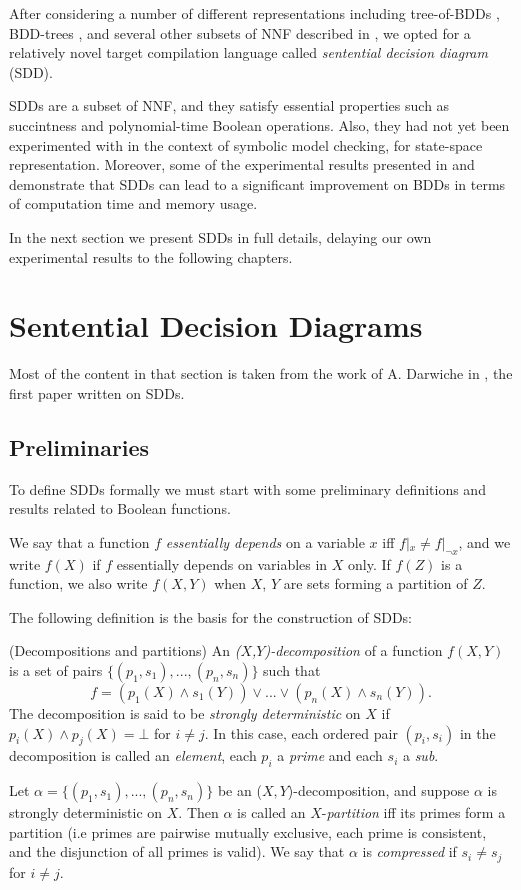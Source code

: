 \documentclass[11pt]{report}
\newenvironment{definition}[1][Definition]{\begin{trivlist}
\item[\hskip \labelsep {\bfseries #1}]}{\end{trivlist}}
\begin{document}
After considering a number of different representations including tree-of-BDDs \cite{trees_of_bdds}, BDD-trees \cite{bdd_trees}, and several other subsets of NNF described in \cite{compilation_map}, we opted for a relatively novel target compilation language called \textit{sentential decision diagram} (SDD). 

SDDs are a subset of NNF, and they satisfy essential properties such as succintness and polynomial-time Boolean operations. Also, they had not yet been experimented with in the context of symbolic model checking, for state-space representation. 
Moreover, some of the experimental results presented in \cite{sdd_1} and \cite{sdd_3} demonstrate that SDDs can lead to a significant improvement on BDDs in terms of computation time and memory usage. 

In the next section we present SDDs in full details, delaying our own experimental results to the following chapters.


\section{Sentential Decision Diagrams}

Most of the content in that section is taken from the work of A. Darwiche in \cite{sdd_1}, the first paper written on SDDs. 

\subsection{Preliminaries}

To define SDDs formally we must start with some preliminary definitions and results related to Boolean functions. 

\begin{definition} 
We say that a function $f$ \textit{essentially depends} on a variable $x$ iff $f|_{x} \neq f|_{\lnot x}$, and we write $f(X)$ if $f$ essentially depends on variables in $X$ only.
If $f(Z)$ is a function, we also write $f(X, Y)$ when $X$, $Y$ are sets forming a partition of $Z$.
\end{definition}
The following definition is the basis for the construction of SDDs:

\begin{definition} (Decompositions and partitions)
An \textit{($X$,$Y$)-decomposition} of a function $f(X, Y)$ is a set of pairs $\{(p_1, s_1),...,(p_n, s_n)\}$ such that $$ f = (p_1(X) \land s_1(Y)) \lor ... \lor (p_n(X) \land s_n(Y)).$$
The decomposition is said to be \textit{strongly deterministic} on $X$ if $p_i(X) \land p_j(X) = \bot$ for $i \neq j$. In this case, each ordered pair $(p_i, s_i)$ in the decomposition is called an \textit{element}, each $p_i$ a \textit{prime} and each $s_i$ a \textit{sub}.

Let $\alpha = \{(p_1, s_1),...,(p_n, s_n)\}$ be an ($X,Y$)-decomposition, and suppose $\alpha$ is strongly deterministic on $X$.
Then $\alpha$ is called an $X$-\textit{partition} iff its primes form a partition (i.e primes are pairwise mutually exclusive, each prime is consistent, and the disjunction of all primes is valid).
We say that $\alpha$ is \textit{compressed} if $s_i \neq s_j$ for $i \neq j$.
\end{definition}
\end{document}
